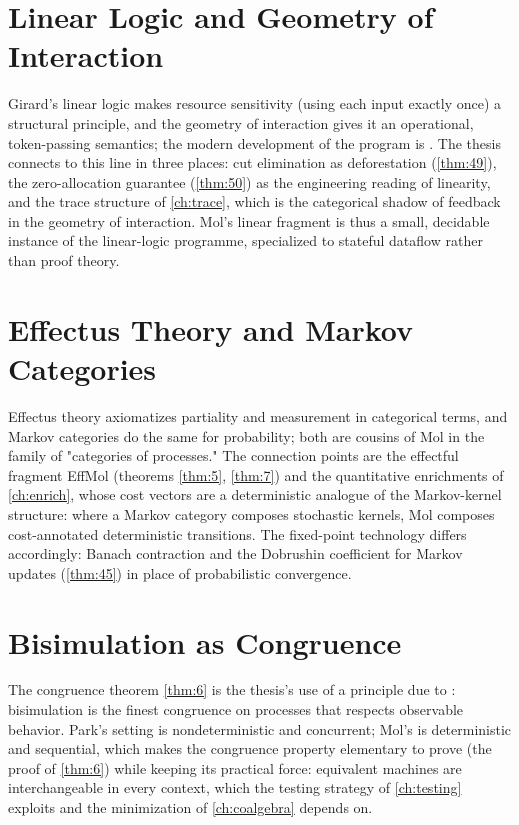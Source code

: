 \section{Linear Logic and Geometry of Interaction}
Girard's linear logic \cite{girard} makes resource sensitivity (using each input exactly once) a structural principle, and the geometry of interaction gives it an operational, token-passing semantics; the modern development of the program is \cite{arxiv-linear-logic-goi}. The thesis connects to this line in three places: cut elimination as deforestation (\ref{thm:49}), the zero-allocation guarantee (\ref{thm:50}) as the engineering reading of linearity, and the trace structure of \autoref{ch:trace}, which is the categorical shadow of feedback in the geometry of interaction. Mol's linear fragment is thus a small, decidable instance of the linear-logic programme, specialized to stateful dataflow rather than proof theory.

\section{Effectus Theory and Markov Categories}
Effectus theory \cite{arxiv-effectus} axiomatizes partiality and measurement in categorical terms, and Markov categories \cite{arxiv-markov-categories} do the same for probability; both are cousins of Mol in the family of "categories of processes." The connection points are the effectful fragment EffMol (theorems \ref{thm:5}, \ref{thm:7}) and the quantitative enrichments of \autoref{ch:enrich}, whose cost vectors are a deterministic analogue of the Markov-kernel structure: where a Markov category composes stochastic kernels, Mol composes cost-annotated deterministic transitions. The fixed-point technology differs accordingly: Banach contraction and the Dobrushin coefficient \cite{dobroushin} for Markov updates (\ref{thm:45}) in place of probabilistic convergence.

\section{Bisimulation as Congruence}
The congruence theorem \ref{thm:6} is the thesis's use of a principle due to \cite{park}: bisimulation is the finest congruence on processes that respects observable behavior. Park's setting is nondeterministic and concurrent; Mol's is deterministic and sequential, which makes the congruence property elementary to prove (the proof of \ref{thm:6}) while keeping its practical force: equivalent machines are interchangeable in every context, which the testing strategy of \autoref{ch:testing} exploits and the minimization of \autoref{ch:coalgebra} depends on.


